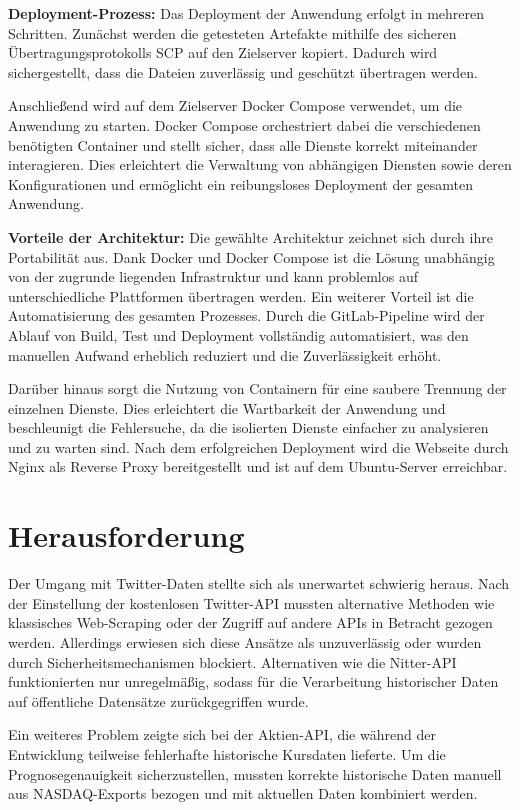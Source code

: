 \documentclass[conference,a4paper,flushend]{cs-techrep}
\begin{document}
\textbf{Deployment-Prozess:}
Das Deployment der Anwendung erfolgt in mehreren Schritten. Zunächst werden die getesteten Artefakte mithilfe des sicheren Übertragungsprotokolls SCP auf den Zielserver kopiert. Dadurch wird sichergestellt, dass die Dateien zuverlässig und geschützt übertragen werden.

Anschließend wird auf dem Zielserver Docker Compose verwendet, um die Anwendung zu starten. Docker Compose orchestriert dabei die verschiedenen benötigten Container und stellt sicher, dass alle Dienste korrekt miteinander interagieren. Dies erleichtert die Verwaltung von abhängigen Diensten sowie deren Konfigurationen und ermöglicht ein reibungsloses Deployment der gesamten Anwendung.

\textbf{Vorteile der Architektur:}
Die gewählte Architektur zeichnet sich durch ihre Portabilität aus. Dank Docker und Docker Compose ist die Lösung unabhängig von der zugrunde liegenden Infrastruktur und kann problemlos auf unterschiedliche Plattformen übertragen werden. Ein weiterer Vorteil ist die Automatisierung des gesamten Prozesses. Durch die GitLab-Pipeline wird der Ablauf von Build, Test und Deployment vollständig automatisiert, was den manuellen Aufwand erheblich reduziert und die Zuverlässigkeit erhöht.

Darüber hinaus sorgt die Nutzung von Containern für eine saubere Trennung der einzelnen Dienste. Dies erleichtert die Wartbarkeit der Anwendung und beschleunigt die Fehlersuche, da die isolierten Dienste einfacher zu analysieren und zu warten sind.
Nach dem erfolgreichen Deployment wird die Webseite durch Nginx als Reverse Proxy bereitgestellt und ist auf dem Ubuntu-Server erreichbar.

\section{Herausforderung}
Der Umgang mit Twitter-Daten stellte sich als unerwartet schwierig heraus. Nach der Einstellung der kostenlosen Twitter-API mussten alternative Methoden wie klassisches Web-Scraping oder der Zugriff auf andere APIs in Betracht gezogen werden. Allerdings erwiesen sich diese Ansätze als unzuverlässig oder wurden durch Sicherheitsmechanismen blockiert. Alternativen wie die Nitter-API funktionierten nur unregelmäßig, sodass für die Verarbeitung historischer Daten auf öffentliche Datensätze zurückgegriffen wurde.

Ein weiteres Problem zeigte sich bei der Aktien-API, die während der Entwicklung teilweise fehlerhafte historische Kursdaten lieferte. Um die Prognosegenauigkeit sicherzustellen, mussten korrekte historische Daten manuell aus NASDAQ-Exports bezogen und mit aktuellen Daten kombiniert werden.
\end{document}
